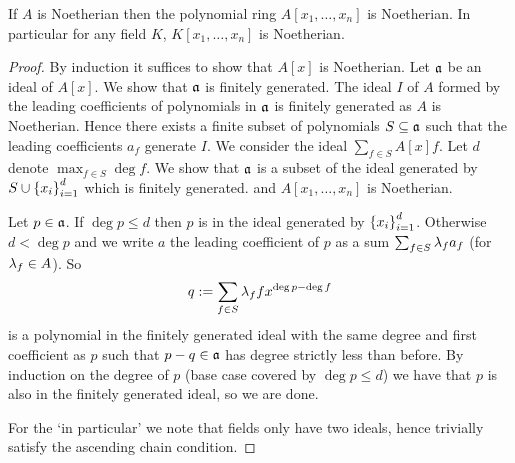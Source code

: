 \begin{prop}
    If $A$ is Noetherian then the polynomial ring $A[x_1, \dots, x_n]$ 
    is Noetherian.
    In particular for any field $K$, $K[x_1, \dots, x_n]$ 
    is Noetherian.
\end{prop}
\begin{proof}
    By induction it suffices to show that $A[x]$ is Noetherian.
    Let $\mathfrak{a}$ be an ideal of $A[x]$. 
    We show that $\mathfrak{a}$ is finitely generated.
    The ideal $I$ of $A$ 
    formed by the leading coefficients of polynomials in $\mathfrak{a}$
    is finitely generated as $A$ is Noetherian.
    Hence there exists a finite subset of polynomials $S \subseteq \mathfrak{a}$
    such that the leading coefficients $a_f$ generate $I$.
    We consider the ideal $\sum_{f \in S}A[x]f$.
    Let $d$ denote $\max_{f \in S} \deg f$.
    We show that $\mathfrak{a}$ is a subset of the ideal generated by 
    $S \cup \left\{x_i\right\}_{i = 1}^d$
    which is finitely generated. 
    and $A[x_1, \dots, x_n]$ is Noetherian.

    Let $p \in \mathfrak{a}$.
    If $\deg p \leq d$ then $p$ is in the ideal generated by 
    $\left\{x_i\right\}_{i = 1}^d$. 
    Otherwise $d < \deg p$ 
    and we write $a$ the leading coefficient of $p$ as a sum 
    $\sum_{f \in S} \lambda_f a_f$ (for $\lambda_f \in A$).
    So 
    \[
        q := \sum_{f \in S} \lambda_f f x^{\deg p - \deg f}
    \]
    is a polynomial in the finitely generated ideal 
    with the same degree and first coefficient as $p$
    such that $p - q \in \mathfrak{a}$ has degree strictly less than before.
    By induction on the degree of $p$ (base case covered by $\deg p \leq d$) 
    we have that $p$ is also in the finitely generated ideal,
    so we are done.

    For the `in particular' we note that fields only have two ideals,
    hence trivially satisfy the ascending chain condition.
\end{proof}